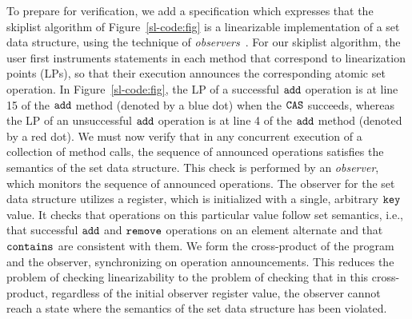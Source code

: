 To prepare for verification, we add a specification which expresses that
the skiplist algorithm of Figure~\ref{sl-code:fig} is a
linearizable implementation of a set data structure, using
the technique of
{\em observers}~\cite{AHHR:integrated,BEEH:icalp15,HSV:concur13,Quy:sas16}.
For our skiplist algorithm, the user first instruments statements in each
method that correspond to linearization points (LPs), so that their execution
announces the corresponding atomic set operation.
In Figure~\ref{sl-code:fig}, the LP of a successful ${\tt add}$ operation is at line 15 of the $\tt add$ method (denoted by a blue dot) when the $\tt CAS$ succeeds, whereas the LP of an unsuccessful $\tt add$ operation is at line 4 of the $\tt add$
method (denoted by a red dot).
We must now verify that in any concurrent
execution of a collection of method calls, the sequence of announced
operations satisfies the semantics of the set data structure.
This check is performed by an {\em observer}, which
monitors the sequence of announced operations. The observer for the set
data structure utilizes a register, which is initialized with
a single, arbitrary $\tt key$ value.
It checks that operations on this particular value follow set semantics,
i.e., that successful $\tt add$ and $\tt remove$ operations on an element alternate and that
$\tt contains$ are consistent with them.
We form %
the cross-product of the program  and the observer, synchronizing on
operation announcements. This reduces the
problem of checking linearizability to the problem of checking that
in this cross-product, regardless of the initial observer register value, the observer cannot reach a state where
the semantics of the set data structure has been violated.


